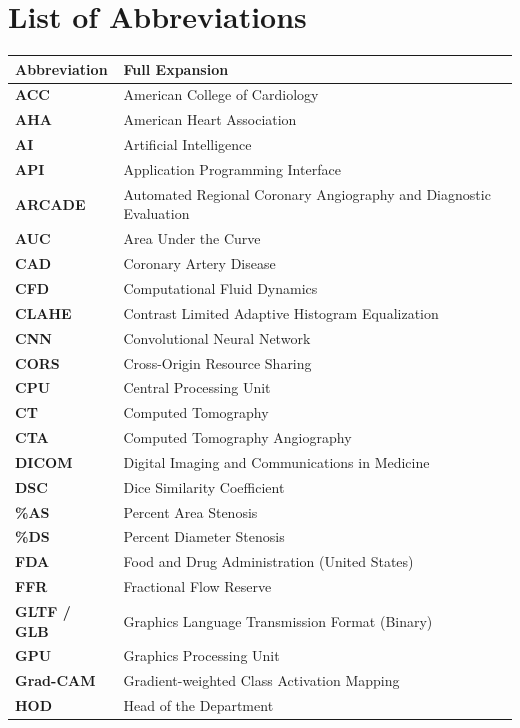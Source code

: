 \chapter*{List of Abbreviations}

\begin{longtable}{ll}
\textbf{Abbreviation} & \textbf{Full Expansion} \\[0.3cm]
\endhead
\textbf{ACC} & American College of Cardiology \\
\textbf{AHA} & American Heart Association \\
\textbf{AI} & Artificial Intelligence \\
\textbf{API} & Application Programming Interface \\
\textbf{ARCADE} & Automated Regional Coronary Angiography and Diagnostic Evaluation \\
\textbf{AUC} & Area Under the Curve \\
\textbf{CAD} & Coronary Artery Disease \\
\textbf{CFD} & Computational Fluid Dynamics \\
\textbf{CLAHE} & Contrast Limited Adaptive Histogram Equalization \\
\textbf{CNN} & Convolutional Neural Network \\
\textbf{CORS} & Cross-Origin Resource Sharing \\
\textbf{CPU} & Central Processing Unit \\
\textbf{CT} & Computed Tomography \\
\textbf{CTA} & Computed Tomography Angiography \\
\textbf{DICOM} & Digital Imaging and Communications in Medicine \\
\textbf{DSC} & Dice Similarity Coefficient \\
\textbf{\%AS} & Percent Area Stenosis \\
\textbf{\%DS} & Percent Diameter Stenosis \\
\textbf{FDA} & Food and Drug Administration (United States) \\
\textbf{FFR} & Fractional Flow Reserve \\
\textbf{GLTF / GLB} & Graphics Language Transmission Format (Binary) \\
\textbf{GPU} & Graphics Processing Unit \\
\textbf{Grad-CAM} & Gradient-weighted Class Activation Mapping \\
\textbf{HOD} & Head of the Department \\

\end{longtable}
